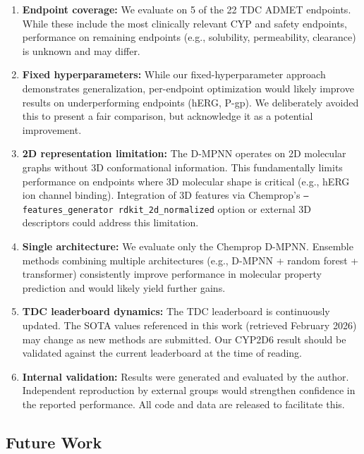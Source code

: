 \documentclass[11pt]{article}
\begin{document}
\begin{enumerate}
    \item \textbf{Endpoint coverage:} We evaluate on 5 of the 22 TDC ADMET endpoints. While these include the most clinically relevant CYP and safety endpoints, performance on remaining endpoints (e.g., solubility, permeability, clearance) is unknown and may differ.

    \item \textbf{Fixed hyperparameters:} While our fixed-hyperparameter approach demonstrates generalization, per-endpoint optimization would likely improve results on underperforming endpoints (hERG, P-gp). We deliberately avoided this to present a fair comparison, but acknowledge it as a potential improvement.

    \item \textbf{2D representation limitation:} The D-MPNN operates on 2D molecular graphs without 3D conformational information. This fundamentally limits performance on endpoints where 3D molecular shape is critical (e.g., hERG ion channel binding). Integration of 3D features via Chemprop's \texttt{--features\_generator rdkit\_2d\_normalized} option or external 3D descriptors could address this limitation.

    \item \textbf{Single architecture:} We evaluate only the Chemprop D-MPNN. Ensemble methods combining multiple architectures (e.g., D-MPNN + random forest + transformer) consistently improve performance in molecular property prediction and would likely yield further gains.

    \item \textbf{TDC leaderboard dynamics:} The TDC leaderboard is continuously updated. The SOTA values referenced in this work (retrieved February 2026) may change as new methods are submitted. Our CYP2D6 result should be validated against the current leaderboard at the time of reading.

    \item \textbf{Internal validation:} Results were generated and evaluated by the author. Independent reproduction by external groups would strengthen confidence in the reported performance. All code and data are released to facilitate this.
\end{enumerate}

\subsection{Future Work}
\end{document}
